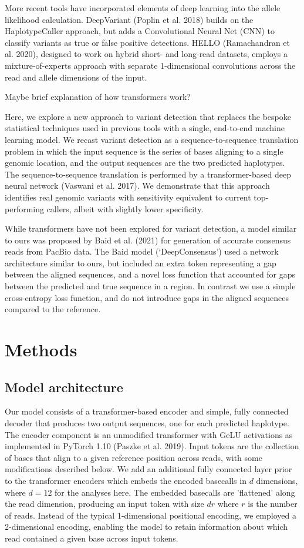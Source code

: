 \documentclass[]{article}
\begin{document}
More recent tools have incorporated elements of deep learning into the allele likelihood calculation. DeepVariant (Poplin et al. 2018) builds on the HaplotypeCaller approach, but adds a Convolutional Neural Net (CNN) to classify variants as true or false positive detections. HELLO (Ramachandran et al. 2020), designed to work on hybrid short- and long-read datasets, employs a mixture-of-experts approach with separate 1-dimensional convolutions across the read and allele dimensions of the input. 

Maybe brief explanation of how transformers work?

Here, we explore a new approach to variant detection that replaces the bespoke statistical techniques used in previous tools with a single, end-to-end machine learning model. We recast variant detection as a sequence-to-sequence translation problem in which the input sequence is the series of bases aligning to a single genomic location, and the output sequences are the two predicted haplotypes. The sequence-to-sequence translation is performed by a transformer-based deep neural network (Vaswani et al. 2017). We demonstrate that this approach identifies real genomic variants with sensitivity equivalent to current top-performing callers, albeit with slightly lower specificity. 

While transformers have not been explored for variant detection, a model similar to ours was proposed by Baid et al. (2021) for generation of accurate consensus reads from PacBio data. The Baid model (`DeepConsensus') used a network architecture similar to ours, but included an extra token representing a gap between the aligned sequences, and a novel loss function that accounted for gaps between the predicted and true sequence in a region. In contrast we use a simple cross-entropy loss function, and do not introduce gaps in the aligned sequences compared to the reference. 

\section{Methods}

\subsection{Model architecture}

Our model consists of a transformer-based encoder and simple, fully connected decoder that produces two output sequences, one for each predicted haplotype. The encoder component is an unmodified transformer with GeLU activations as implemented in PyTorch 1.10 (Paszke et al. 2019). Input tokens are the collection of bases that align to a given reference position across reads, with some modifications described below. We add an additional fully connected layer prior to the transformer encoders which embeds the encoded basecalls in $d$ dimensions, where $d=12$ for the analyses here. The embedded basecalls are 'flattened' along the read dimension, producing an input token with size $dr$ where $r$ is the number of reads. Instead of the typical 1-dimensional positional encoding, we employed a 2-dimensional encoding, enabling the model to retain information about which read contained a given base across input tokens. 
\end{document}
